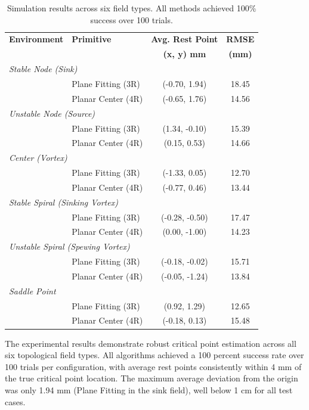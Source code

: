 \documentclass[lettersize,journal]{IEEEtran}
\begin{document}
\begin{table}[h]
\centering
\begin{tabular}{llcc}
\hline
\textbf{Environment} & \textbf{Primitive} & \textbf{Avg. Rest Point} & \textbf{RMSE} \\
 & & \textbf{(x, y) mm} & \textbf{(mm)} \\
\hline
\multicolumn{4}{l}{\textit{Stable Node (Sink)}} \\
\hline
 & Plane Fitting (3R) & (-0.70, 1.94) & 18.45 \\
 & Planar Center (4R) & (-0.65, 1.76) & 14.56 \\
\hline
\multicolumn{4}{l}{\textit{Unstable Node (Source)}} \\
\hline
 & Plane Fitting (3R) & (1.34, -0.10) & 15.39 \\
 & Planar Center (4R) & (0.15, 0.53) & 14.66 \\
\hline
\multicolumn{4}{l}{\textit{Center (Vortex)}} \\
\hline
 & Plane Fitting (3R) & (-1.33, 0.05) & 12.70 \\
 & Planar Center (4R) & (-0.77, 0.46) & 13.44 \\
\hline
\multicolumn{4}{l}{\textit{Stable Spiral (Sinking Vortex)}} \\
\hline
 & Plane Fitting (3R) & (-0.28, -0.50) & 17.47 \\
 & Planar Center (4R) & (0.00, -1.00) & 14.23 \\
\hline
\multicolumn{4}{l}{\textit{Unstable Spiral (Spewing Vortex)}} \\
\hline
 & Plane Fitting (3R) & (-0.18, -0.02) & 15.71 \\
 & Planar Center (4R) & (-0.05, -1.24) & 13.84 \\
\hline
\multicolumn{4}{l}{\textit{Saddle Point}} \\
\hline
 & Plane Fitting (3R) & (0.92, 1.29) & 12.65 \\
 & Planar Center (4R) & (-0.18, 0.13) & 15.48 \\
\hline
\end{tabular}
\caption{Simulation results across six field types. All methods achieved 100\% success over 100 trials.}
\label{tab:simulation_estimation_results}
\end{table}

The experimental results demonstrate robust critical point estimation across all six topological field types. All algorithms achieved a 100 percent success rate over 100 trials per configuration, with average rest points consistently within 4 mm of the true critical point location. The maximum average deviation from the origin was only 1.94 mm (Plane Fitting in the sink field), well below 1 cm for all test cases.
\end{document}
